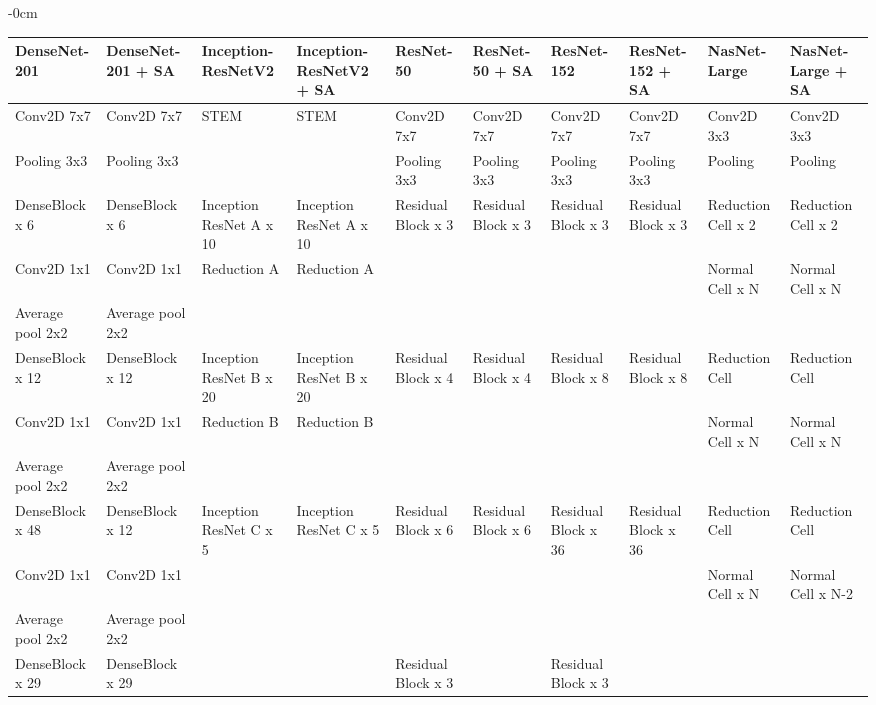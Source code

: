 \documentclass[sensors,article,submit,pdftex,moreauthors]{Definitions/mdpi}
\begin{document}
\begin{table}[H]
	\begin{adjustwidth}{-\extralength}{0cm}
		\begin{tabularx}{\fulllength}{p{1.4cm} | p{1.4cm} | p{1.4cm} | p{1.4cm} | p{1.4cm} | p{1.4cm} | p{1.4cm} | p{1.4cm} | p{1.4cm} | p{1.4cm}}
			\toprule
			\textbf{DenseNet-201} & \textbf{DenseNet-201 + SA} & \textbf{Inception-ResNetV2} & \textbf{Inception-ResNetV2 + SA} & \textbf{ResNet-50} & \textbf{ResNet-50 + SA} & \textbf{ResNet-152} & \textbf{ResNet-152 + SA} & \textbf{NasNet-Large} & \textbf{NasNet-Large + SA}\\
			\midrule
			Conv2D 7x7 & Conv2D 7x7 & STEM& STEM& Conv2D 7x7& Conv2D 7x7& Conv2D 7x7& Conv2D 7x7& Conv2D 3x3& Conv2D 3x3\\ \hline
			Pooling 3x3 & Pooling 3x3 & & & Pooling 3x3& Pooling  3x3& Pooling  3x3& Pooling  3x3& Pooling& Pooling\\ \hline		
			DenseBlock x 6 & DenseBlock x 6 & Inception ResNet A x 10& Inception ResNet A x 10& Residual Block x 3& Residual Block x 3& Residual Block x 3& Residual Block x 3& Reduction Cell x 2& Reduction Cell x 2\\  \hline
			Conv2D 1x1 & Conv2D 1x1 & Reduction A & Reduction A & & & & & Normal Cell x N& Normal Cell x N\\	\hline			
			Average pool 2x2 & Average pool 2x2 & & & & & & & & \\ \hline			
			DenseBlock x 12 & DenseBlock x 12 & Inception ResNet B x 20& Inception ResNet B x 20& Residual Block x 4& Residual Block x 4& Residual Block x 8& Residual Block x 8& Reduction Cell& Reduction Cell\\ \hline
			Conv2D 1x1 & Conv2D 1x1 & Reduction B & Reduction B & & & & & Normal Cell x N& Normal Cell x N\\			\hline
			Average pool 2x2 & Average pool 2x2 & & & & & & & & \\ \hline
			DenseBlock x 48 & DenseBlock x 12 & Inception ResNet C x 5& Inception ResNet C x 5& Residual Block x 6& Residual Block x 6& Residual Block x 36& Residual Block x 36& Reduction Cell& Reduction Cell\\ \hline
			Conv2D 1x1 & Conv2D 1x1 & & & & & & & Normal Cell x N& Normal Cell x N-2\\			\hline
			Average pool 2x2 & Average pool 2x2 & & & & & & & & \\ \hline
			DenseBlock x 29 & DenseBlock x 29 & & & Residual Block x 3& & Residual Block x 3& & & \\ \hline

\end{tabularx}
\end{adjustwidth}
\end{table}
\end{document}

